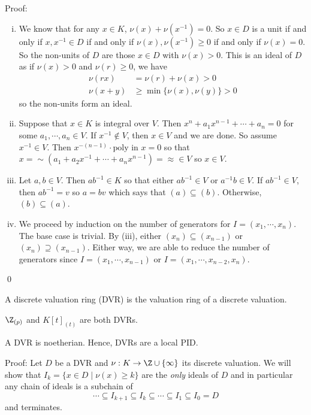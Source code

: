 \noindent Proof:
\begin{enumerate}[(i)]
\item We know that for any $x \in K$, $\nu(x)+\nu(x^{-1})=0$. So $x \in D$ is a unit if and only if $x,x^{-1} \in D$ if and only if $\nu(x),\nu(x^{-1}) \geq 0$ if and only if $\nu(x)=0$. So the non-units of $D$ are those $x \in D$ with $\nu(x)>0$. This is an ideal of $D$ as if $\nu(x)>0$ and $\nu(r) \geq 0$, we have
\[
\begin{split}
\nu(rx)&=\nu(r)+\nu(x) >0 \\
\nu(x+y)&\geq \min\{\nu(x),\nu(y)\}>0
\end{split}
\]
so the non-units form an ideal. 

\item Suppose that $x \in K$ is integral over $V$. Then $x^n+a_1x^{n-1}+\cdots+a_n=0$ for some $a_1,\cdots,a_n \in V$. If $x^{-1} \notin V$, then $x \in V$ and we are done. So assume $x^{-1} \in V$. Then $x^{-(n-1)} \cdot \text{poly in }x=0$ so that $x= \sim(a_1+a_2x^{-1}+\cdots+a_nx^{n-1})= \approx \in V$ so $x \in V$. 

\item Let $a,b \in V$. Then $ab^{-1} \in K$ so that either $ab^{-1} \in V$ or $a^{-1}b \in V$. If $ab^{-1} \in V$, then $ab^{-1}=v$ so $a=bv$ which says that $(a) \subseteq (b)$. Otherwise, $(b) \subseteq (a)$. 

\item We proceed by induction on the number of generators for $I=(x_1,\cdots,x_n)$. The base case is trivial. By (iii), either $(x_n) \subseteq (x_{n-1})$ or $(x_n) \supseteq (x_{n-1})$. Either way, we are able to reduce the number of generators since $I=(x_1,\cdots,x_{n-1})$ or $I=(x_1,\cdots,x_{n-2},x_n)$. 
\end{enumerate}
\qed \\

\begin{dfn}
A discrete valuation ring (DVR) is the valuation ring of a discrete valuation.
\end{dfn}

\begin{ex}
$\Z_{(p)}$ and $K[t]_{(t)}$ are both DVRs. 
\end{ex}

\begin{prop}
A DVR is noetherian. Hence, DVRs are a local PID. 
\end{prop}

\noindent Proof: Let $D$ be a DVR and $\nu: K \to \Z\cup\{\infty\}$ its discrete valuation. We will show that $I_k=\{x \in D \;|\; \nu(x) \geq k\}$ are the \emph{only} ideals of $D$ and in particular any chain of ideals is a subchain of
\[
\cdots \subseteq I_{k+1} \subseteq I_k \subseteq \cdots \subseteq I_1 \subseteq I_0 = D
\]
and terminates. 

